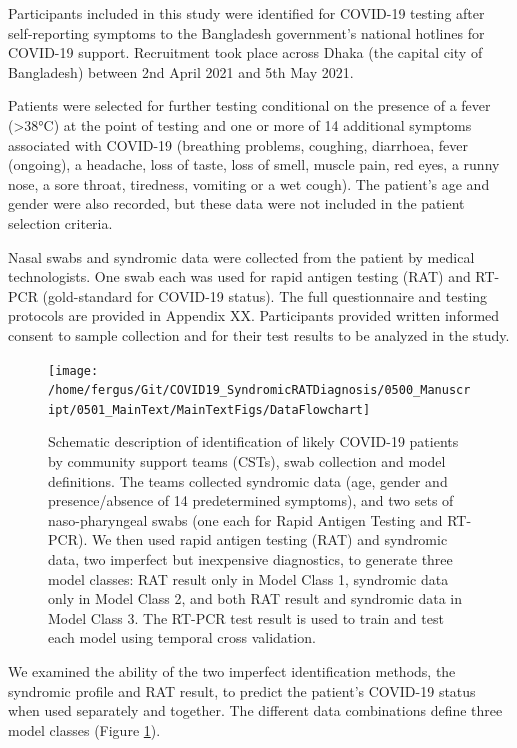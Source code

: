 \documentclass[]{elsarticle} %
\begin{document}
Participants included in this study were identified for COVID-19 testing after self-reporting symptoms to the Bangladesh government's national hotlines for COVID-19 support.
Recruitment took place across Dhaka (the capital city of Bangladesh) between 2nd April 2021 and 5th May 2021.

Patients were selected for further testing conditional on the presence of a fever (\textgreater38°C) at the point of testing and one or more of 14 additional symptoms associated with COVID-19 (breathing problems, coughing, diarrhoea, fever (ongoing), a headache, loss of taste, loss of smell, muscle pain, red eyes, a runny nose, a sore throat, tiredness, vomiting or a wet cough).
The patient's age and gender were also recorded, but these data were not included in the patient selection criteria.

Nasal swabs and syndromic data were collected from the patient by medical technologists.
One swab each was used for rapid antigen testing (RAT) and RT-PCR (gold-standard for COVID-19 status).
The full questionnaire and testing protocols are provided in Appendix XX.
Participants provided written informed consent to sample collection and for their test results to be analyzed in the study.

\begin{figure}
\texttt{[image: /home/fergus/Git/COVID19\_SyndromicRATDiagnosis/0500\_Manuscript/0501\_MainText/MainTextFigs/DataFlowchart]} \caption{Schematic description of identification of likely COVID-19 patients by community support teams (CSTs), swab collection and model definitions. The teams collected syndromic data (age, gender and presence/absence of 14 predetermined symptoms), and two sets of naso-pharyngeal swabs (one each for Rapid Antigen Testing and RT-PCR). We then used rapid antigen testing (RAT) and syndromic data, two imperfect but inexpensive diagnostics, to generate three model classes: RAT result only in Model Class 1, syndromic data only in Model Class 2, and both RAT result and syndromic data in Model Class 3. The RT-PCR test result is used to train and test each model using temporal cross validation.}\label{fig:data-flowchart}
\end{figure}

We examined the ability of the two imperfect identification methods, the syndromic profile and RAT result, to predict the patient's COVID-19 status when used separately and together.
The different data combinations define three model classes (Figure \ref{fig:data-flowchart}).
\end{document}
